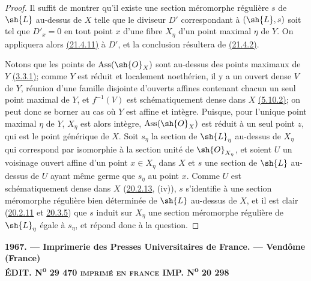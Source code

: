 \begin{proof}
Il suffit de montrer qu'il existe une section méromorphe régulière $s$
de $\sh{L}$ au-dessus de $X$ telle que le diviseur $D'$ correspondant
à $(\sh{L},s)$ soit tel que $D'_x=0$ en tout point $x$ d'une fibre
$X_\eta$ d'un point maximal $\eta$ de $Y$. On appliquera alors
{\hyperlink{ega4.c04.cor.21-4-11}{(21.4.11)}} à $D'$, et la conclusion
résultera de {\hyperlink{ega4.c04.def.21-4-2}{(21.4.2)}}.

Notons que les points de $\operatorname{Ass}(\sh{O}_X)$ sont au-dessus
des points maximaux de $Y$ {\hyperref[canon-index.ega4.c04.prop.3-3-1]{(3.3.1)}};
comme $Y$ est réduit et localement noethérien, il y a un ouvert dense
$V$ de $Y$, réunion d'une famille disjointe d'ouverts affines contenant
chacun un seul point maximal de $Y$, et $f^{-1}(V)$ est
schématiquement dense dans $X$
{\hyperref[canon-index.ega4.c04.prop.5-10-2]{(5.10.2)}}; on peut donc se borner au
cas où $Y$ est affine et intègre. Puisque, pour l'unique point maximal
$\eta$ de $Y$, $X_\eta$ est alors intègre,
$\operatorname{Ass}(\sh{O}_X)$ est réduit à un seul point $z$, qui est
le point générique de $X$. Soit $s_\eta$ la section de $\sh{L}_\eta$
au-dessus de $X_\eta$ qui correspond par isomorphie à la section unité
de $\sh{O}_{X_\eta}$, et soient $U$ un voisinage ouvert affine d'un
point $x\in X_\eta$ dans $X$ et $s$ une section de $\sh{L}$ au-dessus
de $U$ ayant même germe que $s_\eta$ au point $x$. Comme $U$ est
schématiquement dense dans $X$
({\hyperlink{ega4.c04.statement.20-2-13}{20.2.13}}, (iv)), $s$
s'identifie à une section méromorphe régulière bien déterminée de
$\sh{L}$ au-dessus de $X$, et il est clair
({\hyperlink{ega4.c04.prop.20-2-11}{20.2.11}} et
{\hyperlink{ega4.c04.prop.20-3-5}{20.3.5}}) que $s$ induit sur $X_\eta$
une section méromorphe régulière de $\sh{L}_\eta$ égale à $s_\eta$, et
répond donc à la question.
\end{proof}

\bigskip
\begin{center}
\small\bfseries
1967. --- Imprimerie des Presses Universitaires de France. --- Vendôme
(France)\\
ÉDIT. N\textsuperscript{o} 29 470\qquad
\textsc{imprimé en france}\qquad
IMP. N\textsuperscript{o} 20 298
\end{center}
